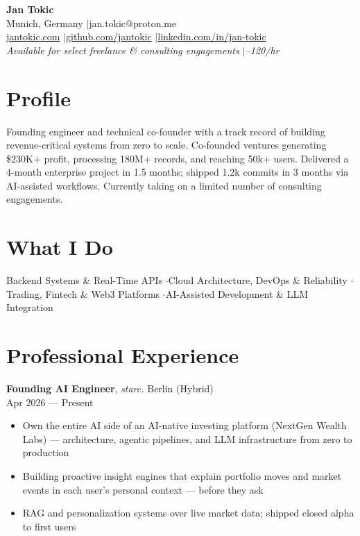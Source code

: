 \documentclass[a4paper,10pt]{article}
\newcommand{\entry}[4]{%
  \textbf{#1}, \textit{#2} \hfill #3 \\ \vspace{-2pt}
  {\small #4}%
}
\begin{document}
\begin{center}
  {\LARGE\bfseries\color{accent} Jan Tokic} \\[2pt]
  Munich, Germany \enspace$\vert$\enspace jan.tokic@proton.me \\[1pt]
  \href{https://jantokic.com}{jantokic.com} \enspace$\vert$\enspace \href{https://github.com/jantokic}{github.com/jantokic} \enspace$\vert$\enspace \href{https://linkedin.com/in/jan-tokic}{linkedin.com/in/jan-tokic} \\[2pt]
  {\small\textit{Available for select freelance \& consulting engagements \enspace$\vert$\enspace {}--120/hr}}
\end{center}

\vspace{-4pt}

\section{Profile}
Founding engineer and technical co-founder with a track record of building revenue-critical systems from zero to scale. Co-founded ventures generating \$230K+ profit, processing 180M+ records, and reaching 50k+ users. Delivered a 4-month enterprise project in 1.5 months; shipped 1.2k commits in 3 months via AI-assisted workflows. Currently taking on a limited number of consulting engagements.

\section{What I Do}
{\small
Backend Systems \& Real-Time APIs \enspace$\cdot$\enspace Cloud Architecture, DevOps \& Reliability \enspace$\cdot$\enspace Trading, Fintech \& Web3 Platforms \enspace$\cdot$\enspace AI-Assisted Development \& LLM Integration
}

\section{Professional Experience}

\entry{Founding AI Engineer}{starc.}{Berlin (Hybrid)}{Apr 2026 --- Present}
\begin{itemize}
  \item Own the entire AI side of an AI-native investing platform (NextGen Wealth Labs) --- architecture, agentic pipelines, and LLM infrastructure from zero to production
  \item Building proactive insight engines that explain portfolio moves and market events in each user's personal context --- before they ask
  \item RAG and personalization systems over live market data; shipped closed alpha to first users
\end{itemize}
\end{document}
